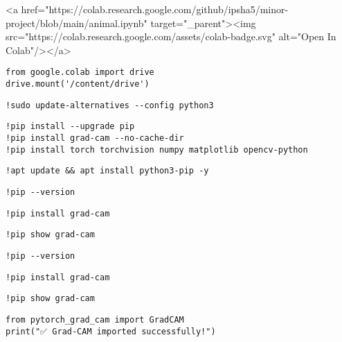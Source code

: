 \documentclass{article}
\begin{document}
<a href="https://colab.research.google.com/github/ipsha5/minor-project/blob/main/animal.ipynb" target="_parent"><img src="https://colab.research.google.com/assets/colab-badge.svg" alt="Open In Colab"/></a>

\begin{verbatim}
from google.colab import drive
drive.mount('/content/drive')
\end{verbatim}

\begin{verbatim}
!sudo update-alternatives --config python3

\end{verbatim}

\begin{verbatim}
!pip install --upgrade pip
!pip install grad-cam --no-cache-dir
!pip install torch torchvision numpy matplotlib opencv-python
\end{verbatim}

\begin{verbatim}
!apt update && apt install python3-pip -y
\end{verbatim}

\begin{verbatim}
!pip --version
\end{verbatim}

\begin{verbatim}
!pip install grad-cam

\end{verbatim}

\begin{verbatim}
!pip show grad-cam

\end{verbatim}

\begin{verbatim}
!pip --version

\end{verbatim}

\begin{verbatim}
!pip install grad-cam

\end{verbatim}

\begin{verbatim}
!pip show grad-cam

\end{verbatim}

\begin{verbatim}
from pytorch_grad_cam import GradCAM
print("✅ Grad-CAM imported successfully!")

\end{verbatim}
\end{document}

